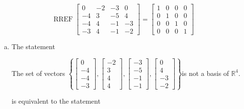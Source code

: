 \begin{exerciseAnswer} 


\[\operatorname{RREF} \left[\begin{array}{cccc}
0 & -2 & -3 & 0 \\
-4 & 3 & -5 & 4 \\
-4 & 4 & -1 & -3 \\
-3 & 4 & -1 & -2
\end{array}\right] = \left[\begin{array}{cccc}
1 & 0 & 0 & 0 \\
0 & 1 & 0 & 0 \\
0 & 0 & 1 & 0 \\
0 & 0 & 0 & 1
\end{array}\right] \]


\begin{enumerate}[(a)]
\item The statement 
\begin{center}\begin{minipage}{0.8\textwidth}
 The set of vectors \( \left\{ \left[\begin{array}{c}
0 \\
-4 \\
-4 \\
-3
\end{array}\right] , \left[\begin{array}{c}
-2 \\
3 \\
4 \\
4
\end{array}\right] , \left[\begin{array}{c}
-3 \\
-5 \\
-1 \\
-1
\end{array}\right] , \left[\begin{array}{c}
0 \\
4 \\
-3 \\
-2
\end{array}\right] \right\} \)is not a basis of \(\mathbb{R}^4\). 
\end{minipage}\end{center}
     is equivalent to the statement 
\begin{center}\begin{minipage}{0.8\textwidth}
 The set of vectors \( \left\{ \left[\begin{array}{c}
0 \\
-4 \\

\end{array}
\end{minipage}
\end{center}
\end{enumerate}
\end{exerciseAnswer}

